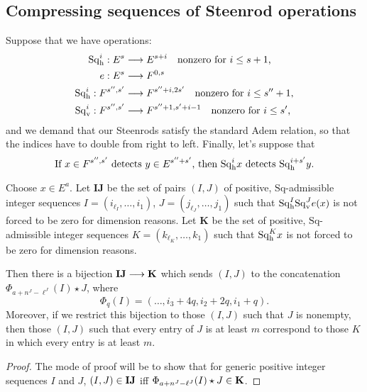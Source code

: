 \documentclass[10pt]{article}
\newcommand{\Sq}{\mathrm{Sq}}
\begin{document}
\begin{CompressingSequencesOfSteenrodOperations}
\pagebreak
\section{Compressing sequences of Steenrod operations}
Suppose that we have operations:
\begin{alignat*}{2}
\Sq_\textup{h}^i:E^{s}&\to E^{s+i}\textup{\quad nonzero for $i\leq s+1$,}\\
e:E^{s}&\to F^{0,s}\\
\Sq_\textup{h}^i:F^{s'',s'}&\to F^{s''+i,2s'}\textup{\quad nonzero for $i\leq s''+1$,}\\
\Sq_\textup{v}^i:F^{s'',s'}&\to F^{s''+1,s'+i-1}\textup{\quad nonzero for $i\leq s'$,}
\end{alignat*}
and we demand that our Steenrods satisfy the standard Adem relation, so that the indices have to double from right to left. Finally, let's suppose that 
\[\textup{If $x\in F^{s'',s'}$ detects $y\in E^{s''+s'}$, then $\Sq_\textup{h}^ix$ detects $\Sq_\textup{h}^{i+s'}y$}.\]

Choose $x\in E^{a}$. Let $\textbf{IJ}$ be the set of pairs $(I,J)$ of positive, $\Sq$-admissible integer sequences $I=(i_{\ell_I},\ldots,i_1)$, $J=(j_{\ell_J},\ldots,j_1)$ such that $\Sq_\textup{h}^I\Sq_\textup{v}^Je(x)$ is not forced to be zero for dimension reasons. Let $\textbf{K}$ be the set of positive, $\Sq$-admissible integer sequences $K=(k_{\ell_K},\ldots,k_1)$ such that $\Sq_\textup{h}^Kx$ is not forced to be zero for dimension reasons.
\begin{prop}
Then there is a bijection $\textup{\textbf{IJ}}\to\textup{\textbf{K}}$ which sends $(I,J)$ to the concatenation $\Phi_{a+n^J-\ell^J}(I)\star J$, where 
\[\Phi_q(I)=(\ldots,i_3+4q,i_2+2q,i_1+q).\]
Moreover, if we restrict this bijection to those $(I,J)$ such that $J$ is nonempty, then those $(I,J)$ such that every entry of $J$ is at least $m$ correspond to those $K$ in which every entry is at least $m$.
\end{prop}
\begin{proof}
The mode of proof will be to show that for generic positive integer sequences $I$ and $J$, $(I,J)\in\textup{\textbf{IJ}}$ iff $\Phi_{a+n^J-\ell^J}(I)\star J\in\textup{\textbf{K}}$.


\end{proof}
\end{CompressingSequencesOfSteenrodOperations}
\end{document}
